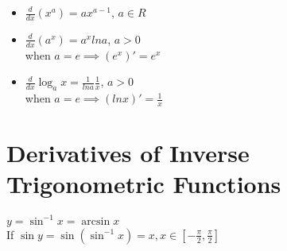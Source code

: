 \begin{itemize}
\item $\displaystyle \frac{d}{dx} (x^a) = ax^{a-1}$, $a \in R$
\item $\displaystyle \frac{d}{dx} (a^x) = a^x lna$, $a > 0$\\
when $\displaystyle a = e \implies (e^x)' = e^x$
\item $\displaystyle \frac{d}{dx} \log_a x = \frac{1}{ln a} \frac{1}{x}$, $a > 0$\\
when $\displaystyle a = e \implies (ln x)' = \frac{1}{x}$
\end{itemize}

\section{Derivatives of Inverse Trigonometric Functions}
$y = \sin ^{-1} x = \arcsin x$\\
If $\displaystyle \sin y = \sin (\sin^{-1} x) = x, x \in [-\frac{\pi}{2}, \frac{\pi}{2}]$
